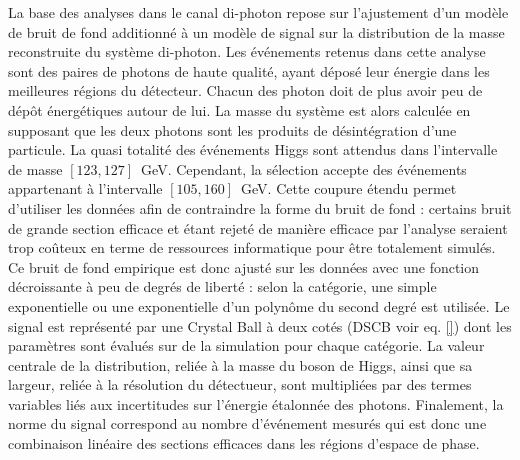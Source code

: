 La base des analyses dans le canal di-photon repose sur l'ajustement d'un modèle de bruit de fond additionné à un modèle de signal sur la distribution de la masse reconstruite du système di-photon.
Les événements retenus dans cette analyse sont des paires de photons de haute qualité, ayant déposé leur énergie dans les meilleures régions du détecteur.
Chacun des photon doit de plus avoir peu de dépôt énergétiques autour de lui.
La masse du système est alors calculée en supposant que les deux photons sont les produits de désintégration d'une particule.
La quasi totalité des événements Higgs sont attendus dans l'intervalle de masse $[123, 127]$~GeV.
Cependant, la sélection accepte des événements appartenant à l'intervalle $[105, 160]$~GeV.
Cette coupure étendu permet d'utiliser les données afin de contraindre la forme du bruit de fond : certains bruit de grande section efficace et étant rejeté de manière efficace par l'analyse seraient trop coûteux en terme de ressources informatique pour être totalement simulés.
Ce bruit de fond empirique est donc ajusté sur les données avec une fonction décroissante à peu de degrés de liberté : selon la catégorie, une simple exponentielle ou une exponentielle d'un polynôme du second degré est utilisée.
Le signal est représenté par une Crystal Ball à deux cotés (DSCB voir eq. \ref{}) dont les paramètres sont évalués sur de la simulation pour chaque catégorie.
La valeur centrale de la distribution, reliée à la masse du boson de Higgs, ainsi que sa largeur, reliée à la résolution du détectueur, sont multipliées par des termes variables liés aux incertitudes sur l'énergie étalonnée des photons.
Finalement, la norme du signal correspond au nombre d'événement mesurés qui est donc une combinaison linéaire des sections efficaces dans les régions d'espace de phase.






